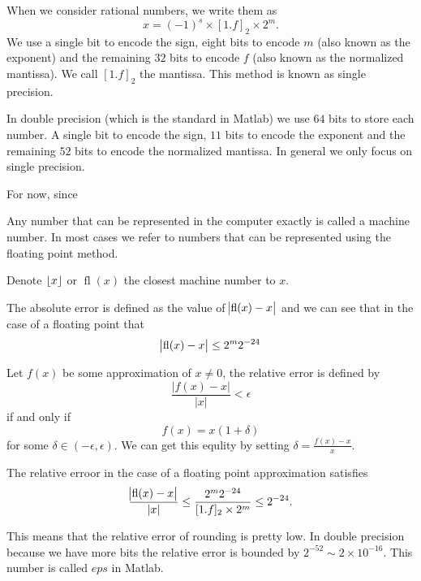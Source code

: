 \documentclass[11pt,a4paper]{article}
\DeclareMathOperator{\fl}{fl}
\begin{document}
When we consider rational numbers, we write them as
\[
    x = (-1)^s \times [1.f]_2 \times 2^m.
\]
We use a single bit to encode the sign, eight bits to encode $m$ (also
known as the exponent) and the remaining $32$ bits to encode $f$ (also known
as the normalized mantissa). We call $[1.f]_2$ the mantissa.
This method is known as single precision.

In double precision (which is the standard in Matlab) we use $64$ bits
to store each number. A single bit to encode the sign, $11$ bits to encode 
the exponent and the remaining $52$ bits to encode the normalized mantissa.
In general we only focus on single precision.

For now, since


\begin{definition}
  Any number that can be represented in the computer exactly is called
  a machine number.
  In most cases we refer to numbers that can be represented using the floating
  point method.
\end{definition}

Denote $\left\lfloor x \right\rfloor$ or $\fl(x)$ the closest machine number to $x$.
\begin{definition}
  The absolute error is defined as the value of $\abs{\fl(x) - x}$ and
  we can see that in the case of a floating point that
  \[
    \abs{\fl(x) - x} \le 2^m 2^{-24}
  \]
\end{definition}

\begin{definition}
  Let $f(x)$ be some approximation of $x \neq 0$, the relative error
  is defined by
  \[
    \frac{|f(x) - x|}{|x|} < \epsilon
  \]
  if and only if
  \[
    f(x)= x(1 + \delta)
  \]
  for some $\delta \in (-\epsilon, \epsilon)$.
  We can get this equlity by setting $\delta = \frac{f(x) - x}{x}$.
\end{definition}

\begin{remark}
  The relative erroor in the case of a floating point approximation satisfies
  \[
    \frac{\abs{\fl(x) - x}}{|x|} \le
    \frac{2^m 2^{-24}}{[1.f]_2 \times 2^m} \le
    2^{-24}.
  \]
\end{remark}
This means that the relative error of rounding is pretty low.
In double precision because we have more bits the relative error
is bounded by $2^{-52} \sim 2 \times 10^{-16}$.
This number is called $eps$ in Matlab.
\end{document}
